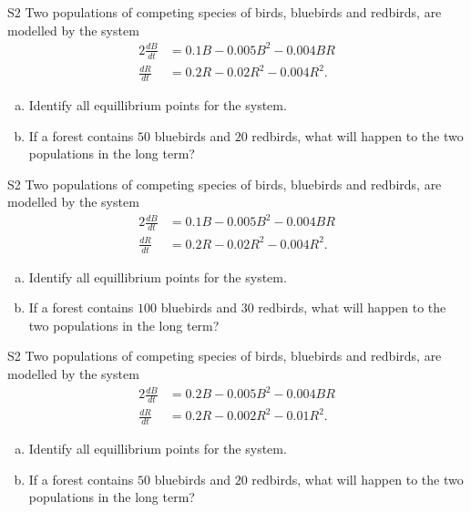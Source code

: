 \begin{problem}{S2}
Two populations of competing species of birds, bluebirds and redbirds, are modelled by the system
\begin{alignat*}{2}
\frac{dB}{dt} &= 0.1B - 0.005B^2 - 0.004BR \\
\frac{dR}{dt} & = 0.2R - 0.02R^2 - 0.004R^2.
\end{alignat*}
\begin{enumerate}[(a)]
\item Identify all equillibrium points for the system.
\item If a forest contains \(50\) bluebirds and \(20\) redbirds, what will happen to the two populations in the long term?
\end{enumerate}
\end{problem}

\begin{problem}{S2}
Two populations of competing species of birds, bluebirds and redbirds, are modelled by the system
\begin{alignat*}{2}
\frac{dB}{dt} &= 0.1B - 0.005B^2 - 0.004BR \\
\frac{dR}{dt} & = 0.2R - 0.02R^2 - 0.004R^2.
\end{alignat*}
\begin{enumerate}[(a)]
\item Identify all equillibrium points for the system.
\item If a forest contains \(100\) bluebirds and \(30\) redbirds, what will happen to the two populations in the long term?
\end{enumerate}
\end{problem}

\begin{problem}{S2}
Two populations of competing species of birds, bluebirds and redbirds, are modelled by the system
\begin{alignat*}{2}
\frac{dB}{dt} &= 0.2B - 0.005B^2 - 0.004BR \\
\frac{dR}{dt} & = 0.2R - 0.002R^2 - 0.01R^2.
\end{alignat*}
\begin{enumerate}[(a)]
\item Identify all equillibrium points for the system.
\item If a forest contains \(50\) bluebirds and \(20\) redbirds, what will happen to the two populations in the long term?
\end{enumerate}
\end{problem}

